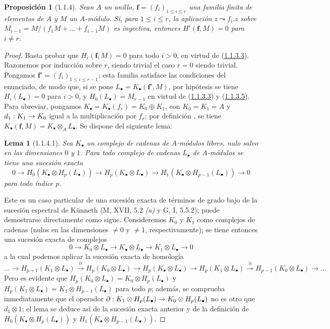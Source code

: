 \documentclass[10pt,oneside,openany]{book}
\theoremstyle{egaenv}\newtheorem*{env}{---}
\theoremstyle{egastatement}
\newtheorem*{proposition}{Proposición}
\newtheorem*{lemma}{Lema}
\theoremstyle{egadescription}
\newcommand{\oldpage}[2][]{\marginnote{\normalfont\scriptsize\textbf{#1}\,|\,#2}\ignorespaces}
\renewcommand{\leq}{\leqslant}
\renewcommand{\to}{\mathchoice{\longrightarrow}{\rightarrow}{\rightarrow}{\rightarrow}}
\begin{document}
\begin{proposition}[1.1.4]
\label{III.1.1.4}
\label{III.1.1.4-fr}
Sean $A$ un anillo, $\mathbf f=(f_i)_{1\leq i\leq r}$ una familia finita de elementos de $A$ y $M$ un $A$-módulo.
Si, para $1\leq i\leq r$, la aplicación $z\leadsto f_i.z$ sobre $M_{i-1}=M/(f_1M+\ldots+f_{i-1}M)$ es inyectiva, entonces $H^i(\mathbf f,M)=0$ para $i\neq r$.
\end{proposition}

\begin{proof}
Basta probar que $H_i(\mathbf f,M)=0$ para todo $i>0$, en virtud de (\hyperref[III.1.1.3.3]{1.1.3.3}).
Razonemos por inducción sobre $r$, siendo trivial el caso $r=0$ siendo trivial. Pongamos $\mathbf f'=(f_i)_{1\leq i\leq r-1}$; esta familia satisface las condiciones del enunciado, de modo que, si se pone $L_\bullet=K_\bullet(\mathbf f',M)$, por hipótesis se tiene $H_i(L_\bullet)=0$ para $i>0$, y $H_0(L_\bullet)=M_{r-1}$ en virtud de (\hyperref[III.1.1.3.3]{1.1.3.3}) y (\hyperref[III.1.1.3.5]{1.1.3.5}).
Para abreviar, pongamos $K_\bullet=K_\bullet(f_r)=K_0\oplus K_1$, con $K_0=K_1=A$ y $d_1:K_1\to K_0$ igual a la multiplicación por $f_r$; por definición , se tiene $K_\bullet(\mathbf f,M)=K_\bullet\otimes_A L_\bullet$.
Se dispone del siguiente lema:

\begin{lemma}[1.1.4.1]
\label{III.1.1.4.1}
\label{III.1.1.4.1-fr}
Sea $K_\bullet$ un complejo de cadenas de $A$-módulos libres, nulo salvo en las dimensiones $0$ y $1$.
Para todo complejo de cadenas $L_\bullet$ de $A$-módulos se tiene una sucesión exacta
\[
0\longrightarrow H_0(K_\bullet\otimes H_p(L_\bullet))
\longrightarrow H_p(K_\bullet\otimes L_\bullet)
\longrightarrow H_1(K_\bullet\otimes H_{p-1}(L_\bullet))
\longrightarrow0
\]
para todo índice $p$.
\end{lemma}

\oldpage[III]{84}
Este es un caso particular de una sucesión exacta de términos de grado bajo de la sucesión espectral de K\"unneth (M, XVII, 5.2 \emph{(a)} y G, I, 5.5.2); puede demostrarse directamente como sigue.
Consideremos $K_0$ y $K_1$ como complejos de cadenas (nulos en las dimensiones $\neq0$ y $\neq1$, respectivamente); se tiene entonces una sucesión exacta de complejos
\[
0\longrightarrow K_0\otimes L_\bullet
\longrightarrow K_\bullet\otimes L_\bullet
\longrightarrow K_1\otimes L_\bullet\longrightarrow0
\] a la cual podemos aplicar la sucesión exacta de homología \[
\ldots\longrightarrow H_{p+1}(K_1\otimes L_\bullet)
\xrightarrow{\partial}H_p(K_0\otimes L_\bullet)
\longrightarrow H_p(K_\bullet\otimes L_\bullet)
\longrightarrow H_p(K_1\otimes L_\bullet)
\xrightarrow{\partial}H_{p-1}(K_0\otimes L_\bullet)
\longrightarrow\ldots
\]
Pero es evidente que $H_p(K_0\otimes L_\bullet)=K_0\otimes H_p(L_\bullet)$ y $H_p(K_1\otimes L_\bullet)=K_1\otimes H_{p-1}(L_\bullet)$ para todo $p$; además, se comprueba inmediatamente que el operador $\partial:K_1\otimes H_p(L_\bullet)\to K_0\otimes H_p(L_\bullet)$ no es otro que $d_1\otimes1$; el lema se deduce así de la sucesión exacta anterior y de la definición de $H_0(K_\bullet\otimes H_p(L_\bullet))$ y $H_1(K_\bullet\otimes H_{p-1}(L_\bullet))$.


\end{proof}
\end{document}
